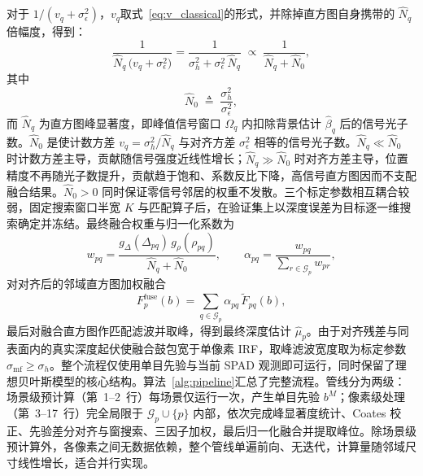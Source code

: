 对于 $1/(v_q + \sigma_\epsilon^{2})$，$v_q$取式~\eqref{eq:v_classical}的形式，并除掉直方图自身携带的 $\hat N_q$ 倍幅度，得到：
\begin{equation}
  \frac{1}{\hat N_q\,\big(v_q+\sigma_\epsilon^2\big)}
  =\frac{1}{\sigma_h^2+\sigma_\epsilon^2\,\hat N_q}
  \;\propto\;\frac{1}{\hat N_q+\hat N_0},
  \label{eq:precision_proxy}
\end{equation}
其中
\begin{equation}
  \hat N_0\;\triangleq\;\frac{\sigma_h^2}{\sigma_\epsilon^2},
\end{equation}
而 $\hat N_q$ 为直方图峰显著度，即峰值信号窗口 $\Omega_q$ 内扣除背景估计 $\hat\beta_q$ 后的信号光子数。$\hat N_0$ 是使计数方差 $v_q=\sigma_h^2/\hat N_q$ 与对齐方差 $\sigma_\epsilon^2$ 相等的信号光子数。$\hat N_q\ll\hat N_0$ 时计数方差主导，贡献随信号强度近线性增长；$\hat N_q\gg\hat N_0$ 时对齐方差主导，位置精度不再随光子数提升，贡献趋于饱和、系数反比下降，高信号直方图因而不支配融合结果。$\hat N_0>0$ 同时保证零信号邻居的权重不发散。三个标定参数相互耦合较弱，固定搜索窗口半宽 $K$ 与匹配算子后，在验证集上以深度误差为目标逐一维搜索确定并冻结。最终融合权重与归一化系数为
\begin{equation}
  w_{pq}=\frac{g_{\Delta}(\Delta_{pq})\,g_{\rho}(\rho_{pq})}{\hat N_q+\hat N_0},
  \qquad
  \alpha_{pq}=\frac{w_{pq}}{\sum_{r\in\mathcal{G}_p}w_{pr}},
  \label{eq:weight}
\end{equation}
对对齐后的邻域直方图加权融合
\begin{equation}
  F_p^{\mathrm{fuse}}(b)
  =\sum_{q\in\mathcal{G}_p}\alpha_{pq}\,\widetilde F_{pq}(b),
  \label{eq:fuse}
\end{equation}
最后对融合直方图作匹配滤波并取峰，得到最终深度估计 $\hat\mu_p$。由于对齐残差与同表面内的真实深度起伏使融合鼓包宽于单像素 IRF，取峰滤波宽度取为标定参数 $\sigma_{\mathrm{mf}}\ge\sigma_h$。整个流程仅使用单目先验与当前 SPAD 观测即可运行，同时保留了理想贝叶斯模型的核心结构。算法~\ref{alg:pipeline}汇总了完整流程。管线分为两级：场景级预计算（第~1--2~行）每场景仅运行一次，产生单目先验 $b^M$；像素级处理（第~3--17~行）完全局限于 $\mathcal{G}_p\cup\{p\}$ 内部，依次完成峰显著度统计、Coates 校正、先验差分对齐与窗搜索、三因子加权，最后归一化融合并提取峰位。除场景级预计算外，各像素之间无数据依赖，整个管线单遍前向、无迭代，计算量随邻域尺寸线性增长，适合并行实现。


